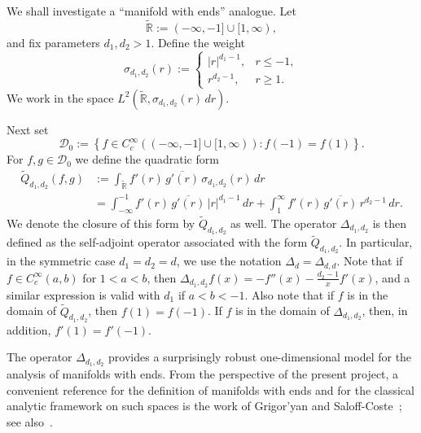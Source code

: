 \documentclass[12pt]{amsart}
\newcommand\R{\mathbb{R}}
\newcommand\Lapdd{\Delta_{d}}
\begin{document}
We shall investigate a ``manifold with ends'' analogue. Let
\[
\widetilde{\R}:=(-\infty,-1]\cup[1,\infty),
\]
and fix parameters $d_1,d_2>1$. Define the weight
\[
\sigma_{d_1,d_2}(r):=
\begin{cases}
|r|^{d_1-1}, & r\leq -1,\\
r^{d_2-1}, & r\geq 1.
\end{cases}
\]
We work in the space $L^2(\widetilde{\R},\sigma_{d_1,d_2}(r)\,dr)$.

Next set 
\[
\mathcal D_0
:=
\left\{
f\in C_c^\infty((-\infty,-1]\cup[1,\infty)):
f(-1)=f(1)
\right\}.
\]
For $f,g\in \mathcal D_0$ we define the quadratic form
\begin{align}\label{Q2}
\widetilde{Q}_{d_1,d_2}(f,g)
&:=\int_{\widetilde{\R}} f'(r)\,\overline{g'(r)}\,\sigma_{d_1,d_2}(r)\,dr \nonumber\\
&=\int_{-\infty}^{-1} f'(r)\,\overline{g'(r)}\,|r|^{d_1-1}\,dr
+\int_{1}^{\infty} f'(r)\,\overline{g'(r)}\,r^{d_2-1}\,dr .
\end{align}
We denote the closure of this form by $\widetilde{Q}_{d_1,d_2}$ as well. 
The operator $\Delta_{d_1,d_2}$ is then defined as the self-adjoint operator associated with the form $\widetilde{Q}_{d_1,d_2}$. 
In particular, in the symmetric case $d_1=d_2=d$, we use the notation $\Lapdd=\Delta_{d,d}$.
Note that if $f\in C_c^{\infty}(a,b)$ for $1<a<b$, then
$\Delta_{d_1,d_2}f(x)=-f''(x)-\frac{d_2-1}{x}f'(x)$, and a similar expression is valid with $d_1$ if $a<b<-1$.
Also note that if $f$ is in the domain of $\widetilde{Q}_{d_1,d_2}$,
then $f(1)=f(-1)$. If $f$ is in the domain of $\Delta_{d_1,d_2}$,
then, in addition, $f'(1)=f'(-1)$.


The operator \(\Delta_{d_1,d_2}\) provides a surprisingly robust one-dimensional
model for the analysis of manifolds with ends. From the perspective of the
present project, a convenient reference for the definition of manifolds with
ends and for the classical analytic framework on such spaces is the work of
Grigor'yan and Saloff-Coste~\cite{GS}; see also~\cite{GIS}.

\end{document}
